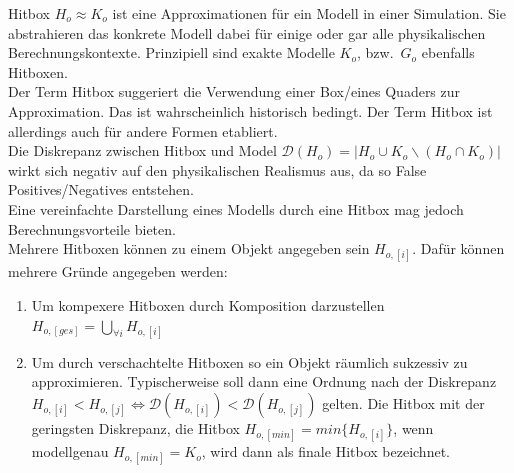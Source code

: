 \label{sec:hitbox}
Hitbox $H_o \approx K_o$ ist eine Approximationen für ein Modell in einer Simulation. Sie abstrahieren das konkrete Modell dabei für einige oder gar alle physikalischen Berechnungskontexte. Prinzipiell sind exakte Modelle $K_o$, bzw.~$G_o$ ebenfalls Hitboxen.\\
Der Term Hitbox suggeriert die Verwendung einer Box/eines Quaders zur Approximation. Das ist wahrscheinlich historisch bedingt. Der Term Hitbox ist allerdings auch für andere Formen etabliert.\\
Die Diskrepanz zwischen Hitbox und Model $\mathcal{D}(H_o) = | H_o \cup K_o \backslash (H_o \cap K_o) |$ wirkt sich negativ auf den physikalischen Realismus aus, da so False Positives/Negatives entstehen.\\
Eine vereinfachte Darstellung eines Modells durch eine Hitbox mag jedoch Berechnungsvorteile bieten.\\
Mehrere Hitboxen können zu einem Objekt angegeben sein $H_{o, [i]}$. Dafür können mehrere Gründe angegeben werden:
\begin{enumerate}
\item Um kompexere Hitboxen durch Komposition darzustellen $H_{o, [ges]} = \bigcup_{\forall i}H_{o, [i]}$
\item Um durch verschachtelte Hitboxen so ein Objekt räumlich sukzessiv zu approximieren.
Typischerweise soll dann eine Ordnung nach der Diskrepanz $H_{o, [i]} < H_{o, [j]} \Leftrightarrow \mathcal{D}(H_{o, [i]}) < \mathcal{D}(H_{o, [j]})$ gelten. Die Hitbox mit der geringsten Diskrepanz, die Hitbox $H_{o, [min]}=min\{H_{o, [i]}\}$, wenn modellgenau $H_{o, [min]} = K_o$, wird dann als finale Hitbox bezeichnet.
\end{enumerate}

